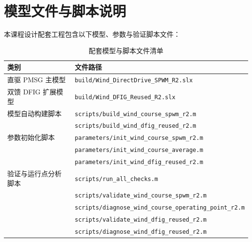 \documentclass[UTF8,zihao=-4,fontset=none]{ctexrep}
\begin{document}
\chapter{模型文件与脚本说明}
本课程设计配套工程包含以下模型、参数与验证脚本文件：
\begin{table}[H]
\centering
\caption{配套模型与脚本文件清单}
\begin{tabular}{p{3.9cm}p{9.1cm}}
\toprule
类别 & 文件路径\\
\midrule
直驱 PMSG 主模型 & \texttt{build/Wind\_DirectDrive\_SPWM\_R2.slx}\\
双馈 DFIG 扩展模型 & \texttt{build/Wind\_DFIG\_Reused\_R2.slx}\\
模型自动构建脚本 & \texttt{scripts/build\_wind\_course\_spwm\_r2.m}\\
 & \texttt{scripts/build\_wind\_dfig\_reused\_r2.m}\\
参数初始化脚本 & \texttt{parameters/init\_wind\_course\_spwm\_r2.m}\\
 & \texttt{parameters/init\_wind\_course\_average.m}\\
 & \texttt{parameters/init\_wind\_dfig\_reused\_r2.m}\\
验证与运行点分析脚本 & \texttt{scripts/run\_all\_checks.m}\\
 & \texttt{scripts/validate\_wind\_course\_spwm\_r2.m}\\
 & \texttt{scripts/diagnose\_wind\_course\_operating\_point\_r2.m}\\
 & \texttt{scripts/validate\_wind\_dfig\_reused\_r2.m}\\
 & \texttt{scripts/diagnose\_wind\_dfig\_reused\_r2.m}\\
\bottomrule
\end{tabular}
\end{table}
\end{document}
